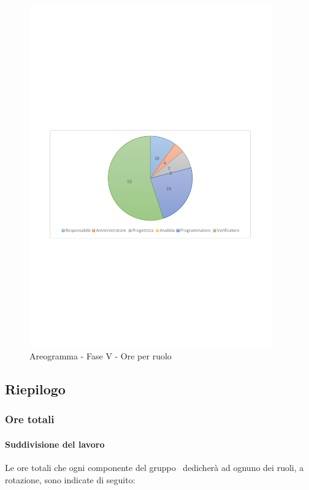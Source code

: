 \documentclass[../PianoProgetto.tex]{subfiles}
\begin{document}
	\begin{figure}[!h]
		\centering
		\includegraphics[width=0.93\textwidth , trim=2cm 9.5cm 2cm 11cm]{grafici/V/V-ore-ruolo}
			\caption{Areogramma - Fase V - Ore per ruolo}
		\label{fig:CircleChart-faseV_ore_r}
	\end{figure}
	
	
	\subsection{Riepilogo}
			\subsubsection{Ore totali}
				\paragraph{Suddivisione del lavoro}
					Le ore totali che ogni componente del gruppo \leaf\ dedicherà ad ognuno dei ruoli, a rotazione, sono indicate di seguito:
	
\end{document}
